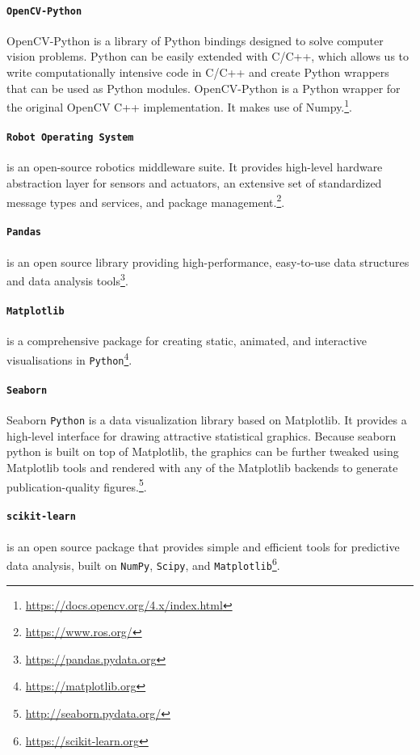 \paragraph*{\texttt{OpenCV-Python}} OpenCV-Python is a library of Python bindings designed to solve computer vision problems. Python can be easily extended with C/C++, which allows us to write computationally intensive code in C/C++ and create Python wrappers that can be used as Python modules. OpenCV-Python is a Python wrapper for the original OpenCV C++ implementation. It makes use of Numpy.\footnote{\url{https://docs.opencv.org/4.x/index.html}}.

\paragraph*{\texttt{Robot Operating System}} is an open-source robotics middleware suite. It provides high-level hardware abstraction layer for sensors and actuators, an extensive set of standardized message types and services, and package management.\footnote{\url{https://www.ros.org/}}.

\paragraph*{\texttt{Pandas}} is an open source library providing high-performance, easy-to-use data structures and data analysis tools\footnote{\url{https://pandas.pydata.org}}.

\paragraph*{\texttt{Matplotlib}} is a comprehensive package for creating static, animated, and interactive visualisations in \texttt{Python}\footnote{\url{https://matplotlib.org}}.

\paragraph*{\texttt{Seaborn}} Seaborn \texttt{Python} is a data visualization library based on Matplotlib. It provides a high-level interface for drawing attractive statistical graphics. Because seaborn python is built on top of Matplotlib, the graphics can be further tweaked using Matplotlib tools and rendered with any of the Matplotlib backends to generate publication-quality figures.\footnote{\url{http://seaborn.pydata.org/}}.

\paragraph*{\texttt{scikit-learn}} is an open source package that provides simple and efficient tools for predictive data analysis, built on \texttt{NumPy}, \texttt{Scipy}, and \texttt{Matplotlib}\footnote{\url{https://scikit-learn.org}}.
